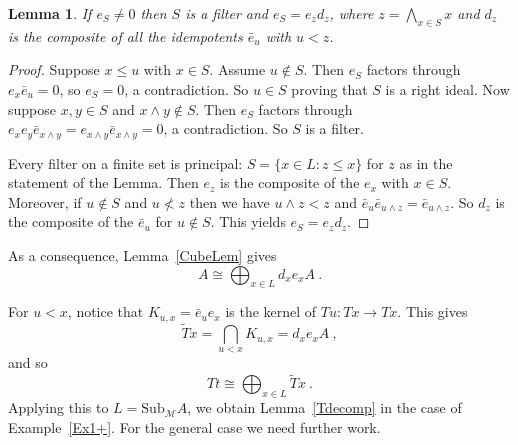 \documentclass[a4paper,12pt,reqno]{amsart}
\newtheorem{lemma}[theorem]{Lemma}
\theoremstyle{definition}
\theoremstyle{fact}
\theoremstyle{genquest}
\theoremstyle{step}
\newcommand{\ra}{\rightarrow}
\def\CM{{\mathscr M}}
\begin{document}
\begin{lemma}\label{filter}
If $e_S\ne 0$ then $S$ is a filter and $e_S = e_z d_z$,
where $z = \bigwedge_{x\in S}{x}$ and $d_z$ is 
the composite of all the idempotents $\bar{e}_u$
with $u < z$.
\end{lemma}
\begin{proof}
Suppose $x\le u$ with $x\in S$. Assume $u\notin S$. 
Then $e_S$ factors through
$e_x  \bar{e}_u = 0$, so $e_S=0$, a contradiction. 
So $u\in S$ proving that $S$ is a right ideal. 
Now suppose $x,y\in S$ and $x\wedge y\notin S$.
Then $e_S$ factors through 
$e_x e_y \bar{e}_{x\wedge y} = e_{x\wedge y} \bar{e}_{x\wedge y} = 0$,
a contradiction. So $S$ is a filter.

Every filter on a finite set is principal: $S=\{x\in L : z\le x\}$ for $z$ as in the
statement of the Lemma. Then $e_z$ is the composite of the $e_x$ with $x\in S$. 
Moreover, if $u\notin S$ and $u \not< z$ then we
have $u \wedge z < z$ and $\bar{e}_u \bar{e}_{u \wedge z} = \bar{e}_{u \wedge z}$.
So $d_z$ is the composite of the $\bar{e}_u$ for $u\notin S$.
This yields $e_S = e_z d_z$.  
\end{proof}

As a consequence, Lemma~\ref{CubeLem} gives
\begin{equation}
A\cong \bigoplus_{x\in L}{d_xe_xA} \ .
\end{equation}

For $u<x$, notice that $K_{u,x} = \bar{e}_ue_x$ is the kernel of $Tu : Tx \ra Tx$.
This gives 
\begin{equation}
\widetilde{T}x= \bigcap_{u<x}K_{u,x} = d_xe_xA \ , 
\end{equation}
and so
\begin{equation}
Tt \cong \bigoplus_{x\in L}{\widetilde{T}x} \ . 
\end{equation}
Applying this to $L = \mathrm{Sub}_{\CM}A$, we obtain Lemma~\ref{Tdecomp} 
in the case of Example~\ref{Ex1+}. For the general case we need further work.
 
\end{document}
